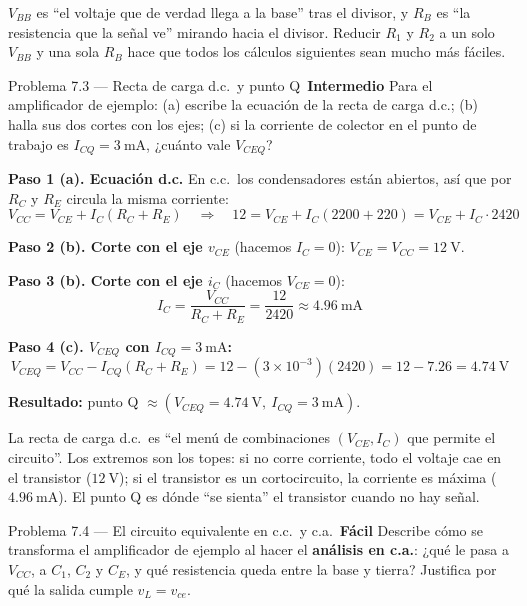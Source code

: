 \documentclass[11pt,a4paper]{article}
\newcommand{\facil}{\textcolor{verdeSignal}{\faIcon{circle}\,\textbf{Fácil}}}
\newcommand{\intermedio}{\textcolor{naranjaVivo}{\faIcon{circle}\,\textbf{Intermedio}}}
\begin{document}
\begin{porqueBox}
$V_{BB}$ es ``el voltaje que de verdad llega a la base'' tras el divisor, y $R_B$ es ``la resistencia que la señal ve'' mirando hacia el divisor. Reducir $R_1$ y $R_2$ a un solo $V_{BB}$ y una sola $R_B$ hace que todos los cálculos siguientes sean mucho más fáciles.
\end{porqueBox}

\begin{problemaBox}{Problema 7.3 --- Recta de carga d.c.\ y punto Q \quad \intermedio}
Para el amplificador de ejemplo: (a) escribe la ecuación de la recta de carga d.c.; (b) halla sus dos cortes con los ejes; (c) si la corriente de colector en el punto de trabajo es $I_{CQ}=3\ \text{mA}$, ¿cuánto vale $V_{CEQ}$?
\end{problemaBox}

\begin{solucionBox}
\textbf{Paso 1 (a). Ecuación d.c.} En c.c.\ los condensadores están abiertos, así que por $R_C$ y $R_E$ circula la misma corriente:
\[
V_{CC}=V_{CE}+I_C(R_C+R_E)\quad\Rightarrow\quad 12=V_{CE}+I_C(2200+220)=V_{CE}+I_C\cdot 2420
\]

\textbf{Paso 2 (b). Corte con el eje $v_{CE}$} (hacemos $I_C=0$): $V_{CE}=V_{CC}=12\ \text{V}$.

\textbf{Paso 3 (b). Corte con el eje $i_C$} (hacemos $V_{CE}=0$):
\[
I_C=\frac{V_{CC}}{R_C+R_E}=\frac{12}{2420}\approx 4.96\ \text{mA}
\]

\textbf{Paso 4 (c). $V_{CEQ}$ con $I_{CQ}=3\ \text{mA}$:}
\[
V_{CEQ}=V_{CC}-I_{CQ}(R_C+R_E)=12-(3\times10^{-3})(2420)=12-7.26=4.74\ \text{V}
\]

\textbf{Resultado:} punto Q $\approx (V_{CEQ}=4.74\ \text{V},\ I_{CQ}=3\ \text{mA})$.
\end{solucionBox}

\begin{porqueBox}
La recta de carga d.c.\ es ``el menú de combinaciones $(V_{CE}, I_C)$ que permite el circuito''. Los extremos son los topes: si no corre corriente, todo el voltaje cae en el transistor ($12\ \text{V}$); si el transistor es un cortocircuito, la corriente es máxima ($4.96\ \text{mA}$). El punto Q es dónde ``se sienta'' el transistor cuando no hay señal.
\end{porqueBox}

\begin{problemaBox}{Problema 7.4 --- El circuito equivalente en c.c.\ y c.a. \quad \facil}
Describe cómo se transforma el amplificador de ejemplo al hacer el \textbf{análisis en c.a.}: ¿qué le pasa a $V_{CC}$, a $C_1$, $C_2$ y $C_E$, y qué resistencia queda entre la base y tierra? Justifica por qué la salida cumple $v_L=v_{ce}$.
\end{problemaBox}
\end{document}
